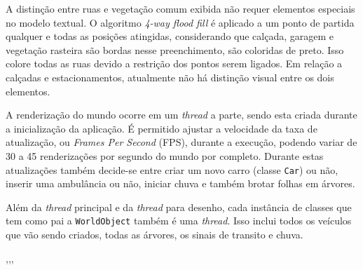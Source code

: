 A distinção entre ruas e vegetação comum exibida não requer elementos
especiais no modelo textual. O algoritmo \textit{4-way flood fill} é
aplicado a um ponto de partida qualquer e todas as posições atingidas,
considerando que calçada, garagem e vegetação rasteira são bordas
nesse preenchimento, são coloridas de preto. Isso colore todas as ruas
devido a restrição dos pontos serem ligados. Em relação a calçadas e
estacionamentos, atualmente não há distinção visual entre os dois
elementos.

A renderização do mundo ocorre em um \textit{thread} a parte, sendo
esta criada durante a inicialização da aplicação. É permitido ajustar
a velocidade da taxa de atualização, ou \textit{Frames Per Second} (FPS),
durante a execução, podendo variar de 30 a 45 renderizações por
segundo do mundo por completo. Durante estas atualizações também
decide-se entre criar um novo carro (classe \verb!Car!) ou não,
inserir uma ambulância ou não, iniciar chuva e também brotar folhas em
árvores.

Além da \textit{thread} principal e da \textit{thread} para desenho,
cada instância de classes que tem como pai a \verb!WorldObject! também
é uma \textit{thread}. Isso inclui todos os veículos que vão sendo
criados, todas as árvores, os sinais de transito e chuva.

,,,
